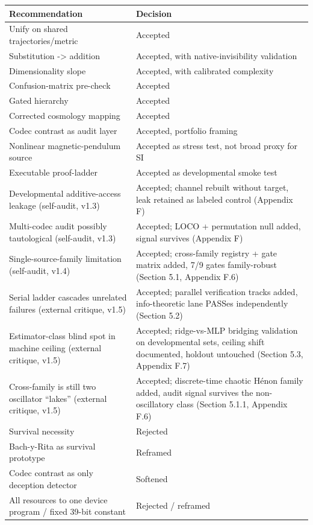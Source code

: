\documentclass[
  11pt,
]{article}
\newcounter{none} %
\begin{document}
{\def\LTcaptype{none} %
\begin{longtable}[]{@{}
  >{\raggedright\arraybackslash}p{}
  >{\raggedright\arraybackslash}p{}@{}}
\toprule\noalign{}
\begin{minipage}[b]{\linewidth}\raggedright
Recommendation
\end{minipage} &
\begin{minipage}[b]{\linewidth}\raggedright
Decision
\end{minipage} \\
\midrule\noalign{}
\endhead
\bottomrule\noalign{}
\endlastfoot
Unify on shared trajectories/metric &
Accepted \\
Substitution -\textgreater{} addition &
Accepted, with native-invisibility validation \\
Dimensionality slope & Accepted, with calibrated
complexity \\
Confusion-matrix pre-check & Accepted \\
Gated hierarchy & Accepted \\
Corrected cosmology mapping & Accepted \\
Codec contrast as audit layer & Accepted,
portfolio framing \\
Nonlinear magnetic-pendulum source & Accepted as
stress test, not broad proxy for SI \\
Executable proof-ladder & Accepted as
developmental smoke test \\
Developmental additive-access leakage
(self-audit, v1.3) & Accepted; channel rebuilt
without target, leak retained as labeled control
(Appendix F) \\
Multi-codec audit possibly tautological
(self-audit, v1.3) & Accepted; LOCO +
permutation null added, signal survives
(Appendix F) \\
Single-source-family limitation (self-audit,
v1.4) & Accepted; cross-family registry + gate
matrix added, 7/9 gates family-robust (Section
5.1, Appendix F.6) \\
Serial ladder cascades unrelated failures
(external critique, v1.5) & Accepted; parallel
verification tracks added, info-theoretic lane
PASSes independently (Section 5.2) \\
Estimator-class blind spot in machine ceiling
(external critique, v1.5) & Accepted;
ridge-vs-MLP bridging validation on
developmental sets, ceiling shift documented,
holdout untouched (Section 5.3, Appendix F.7) \\
Cross-family is still two oscillator ``lakes''
(external critique, v1.5) & Accepted;
discrete-time chaotic Hénon family added, audit
signal survives the non-oscillatory class
(Section 5.1.1, Appendix F.6) \\
Survival necessity & Rejected \\
Bach-y-Rita as survival prototype & Reframed \\
Codec contrast as only deception detector &
Softened \\
All resources to one device program / fixed
39-bit constant & Rejected / reframed \\
\end{longtable}
}
\end{document}
